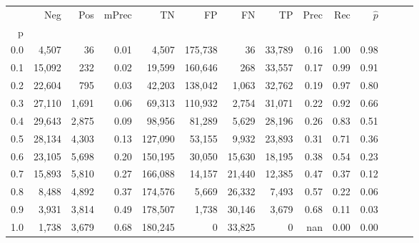 \begin{tabular}{rrrrrrrrrrrrrr}
\toprule
{} &     Neg &    Pos & mPrec &       TN &       FP &      FN &      TP &  Prec &   Rec & $\hat{p}$ \\
p   &         &        &       &          &          &         &         &       &       &           \\
\midrule
0.0 &   4,507 &     36 &  0.01 &    4,507 &  175,738 &      36 &  33,789 &  0.16 &  1.00 &      0.98 \\
0.1 &  15,092 &    232 &  0.02 &   19,599 &  160,646 &     268 &  33,557 &  0.17 &  0.99 &      0.91 \\
0.2 &  22,604 &    795 &  0.03 &   42,203 &  138,042 &   1,063 &  32,762 &  0.19 &  0.97 &      0.80 \\
0.3 &  27,110 &  1,691 &  0.06 &   69,313 &  110,932 &   2,754 &  31,071 &  0.22 &  0.92 &      0.66 \\
0.4 &  29,643 &  2,875 &  0.09 &   98,956 &   81,289 &   5,629 &  28,196 &  0.26 &  0.83 &      0.51 \\
0.5 &  28,134 &  4,303 &  0.13 &  127,090 &   53,155 &   9,932 &  23,893 &  0.31 &  0.71 &      0.36 \\
0.6 &  23,105 &  5,698 &  0.20 &  150,195 &   30,050 &  15,630 &  18,195 &  0.38 &  0.54 &      0.23 \\
0.7 &  15,893 &  5,810 &  0.27 &  166,088 &   14,157 &  21,440 &  12,385 &  0.47 &  0.37 &      0.12 \\
0.8 &   8,488 &  4,892 &  0.37 &  174,576 &    5,669 &  26,332 &   7,493 &  0.57 &  0.22 &      0.06 \\
0.9 &   3,931 &  3,814 &  0.49 &  178,507 &    1,738 &  30,146 &   3,679 &  0.68 &  0.11 &      0.03 \\
1.0 &   1,738 &  3,679 &  0.68 &  180,245 &        0 &  33,825 &       0 &   nan &  0.00 &      0.00 \\
\bottomrule
\end{tabular}
